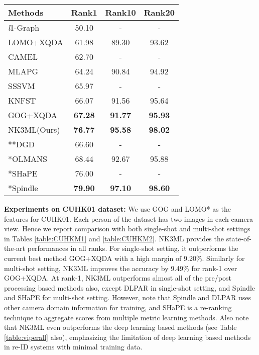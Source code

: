 \documentclass[runningheads]{llncs}
\begin{document}
\begin{table}[t]
\begin{center}
{\begin{tabular}{|l|c|c|c|}
\hline
Methods  & Rank1 & Rank10 & Rank20 \\
\hline\hline
\textit{l}1-Graph\cite{UlGraph}  & 50.10&-&-\\
LOMO+XQDA\cite{LOMO} & 61.98 	&89.30		&93.62\\
CAMEL\cite{CAMEL}  &62.70 &-&-\\
MLAPG\cite{MLAPG}  & 64.24 &90.84&94.92\\
SSSVM\cite{SSSVM} &65.97&-&-\\
KNFST\cite{Zheng:nfst}&66.07&		91.56&		95.64\\
GOG+XQDA\cite{GOG}  & \color{blue}\textbf{67.28}		&\color{blue}\textbf{91.77}		&\color{blue}\textbf{95.93}\\
NK3ML(Ours) & \color{red}\textbf{76.77}	&\color{red}\textbf{95.58}&		\color{red}\textbf{98.02}\\
\hline \hline
**DGD\cite{DGD} & 66.60& -&-\\
*OLMANS\cite{OnlineNegSamples}  & 68.44&		92.67&	95.88\\
*SHaPE\cite{SHaPE} & 76.00 & -&-\\
*Spindle\cite{SpindleNet}  & \color{red}\textbf{79.90}&		\color{red}\textbf{97.10}&	\color{red}\textbf{98.60}\\
\hline
\end{tabular}
\label{table:CUHKM2}
}
\end{center}
\label{table:CUHK}
\end{table}

\setlength{\parskip}{1mm}
\noindent\textbf{Experiments on CUHK01 dataset:}
We use GOG and LOMO* as the features for CUHK01. Each person of the dataset has two images in each camera view. Hence we report comparison with both single-shot and multi-shot settings in Tables \ref{table:CUHKM1} and \ref{table:CUHKM2}. NK3ML provides the state-of-the-art performances in all ranks. For single-shot setting, it outperforms the current best method GOG+XQDA\cite{GOG} with a high margin of 9.20\%. Similarly for multi-shot setting, NK3ML improves the accuracy by  9.49\% for rank-1 over GOG+XQDA. At rank-1, NK3ML outperforms almost all of the pre/post processing based methods also, except DLPAR\cite{DLPAR} in single-shot setting, and Spindle\cite{SpindleNet} and SHaPE\cite{SHaPE} for multi-shot setting. However, note that Spindle and DLPAR uses other camera domain information for training, and SHaPE is a re-ranking technique to aggregate scores from multiple metric learning methods. Also note that NK3ML even outperforms the deep learning based methods
 (see Table \ref{table:viperall} also),
emphasizing the limitation of deep learning based methods in re-ID systems with minimal training data.
\setlength{\parskip}{0mm}
\end{document}
